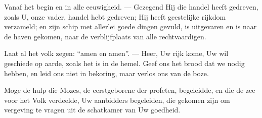 \documentclass[12pt,twoside,a5paper]{article}
\begin{document}
\begin{halfparskip}
  Vanaf het begin en in alle eeuwigheid. --- Gezegend Hij die handel heeft gedreven, zoals U, onze vader, handel hebt gedreven; Hij heeft geestelijke rijkdom verzameld; en zijn schip met allerlei goede dingen gevuld, is uitgevaren en is naar de haven gekomen, naar de verblijfplaats van alle rechtvaardigen.

  Laat al het volk zegen: ``amen en amen''. --- Heer, Uw rijk kome, Uw wil geschiede op aarde, zoals het is in de hemel. Geef ons het brood dat we nodig hebben, en leid ons niet in bekoring, maar verlos ons van de boze.

  Moge de hulp die Mozes, de eerstgeborene der profeten, begeleidde, en die de zee voor het Volk verdeelde, Uw aanbidders begeleiden, die gekomen zijn om vergeving te vragen uit de schatkamer van Uw goedheid.
\end{halfparskip}
\end{document}
